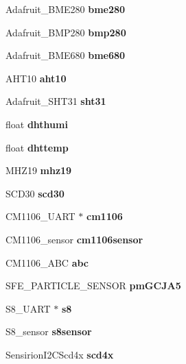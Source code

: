\begin{DoxyCompactItemize}
Adafruit\+\_\+\+B\+M\+E280 {\bfseries bme280}
\item 
\mbox{\label{classSensors_a5af169078d14a1272bdf390109041df0}} 
Adafruit\+\_\+\+B\+M\+P280 {\bfseries bmp280}
\item 
\mbox{\label{classSensors_a9c16019668f5e0e883211d1259331af3}} 
Adafruit\+\_\+\+B\+M\+E680 {\bfseries bme680}
\item 
\mbox{\label{classSensors_a62d8160f55965ccee5a12d9431c1918f}} 
A\+H\+T10 {\bfseries aht10}
\item 
\mbox{\label{classSensors_a8b5bcd2158f4ed4eb1674cc483cfab1d}} 
Adafruit\+\_\+\+S\+H\+T31 {\bfseries sht31}
\item 
\mbox{\label{classSensors_a5edc17132cf264dd930732d04ee6b93b}} 
float {\bfseries dhthumi}
\item 
\mbox{\label{classSensors_a6187794b1329fb68d280df2ee3639e04}} 
float {\bfseries dhttemp}
\item 
\mbox{\label{classSensors_ad6156b78908fd064761301339e54c8af}} 
M\+H\+Z19 {\bfseries mhz19}
\item 
\mbox{\label{classSensors_a23eda1a35572934dab10cfca3635abde}} 
S\+C\+D30 {\bfseries scd30}
\item 
\mbox{\label{classSensors_a3f92336ae7ee535c6417111075949ad1}} 
C\+M1106\+\_\+\+U\+A\+RT $\ast$ {\bfseries cm1106}
\item 
\mbox{\label{classSensors_a8b00eb1d005ea6634307c236d6a39a70}} 
C\+M1106\+\_\+sensor {\bfseries cm1106sensor}
\item 
\mbox{\label{classSensors_ace9ca82dcea1486bdf395cacdb7d2620}} 
C\+M1106\+\_\+\+A\+BC {\bfseries abc}
\item 
\mbox{\label{classSensors_a98fa1dc37540b4c3c11609c7840ada8b}} 
S\+F\+E\+\_\+\+P\+A\+R\+T\+I\+C\+L\+E\+\_\+\+S\+E\+N\+S\+OR {\bfseries pm\+G\+C\+J\+A5}
\item 
\mbox{\label{classSensors_ad5b958024787912f4ab413034a3a0a75}} 
S8\+\_\+\+U\+A\+RT $\ast$ {\bfseries s8}
\item 
\mbox{\label{classSensors_adfac0bef57dc49feb0de18a3a8492ca0}} 
S8\+\_\+sensor {\bfseries s8sensor}
\item 
\mbox{\label{classSensors_a15b986d752487db6a9a61948f255eb84}} 
Sensirion\+I2\+C\+Scd4x {\bfseries scd4x}
\end{DoxyCompactItemize}


